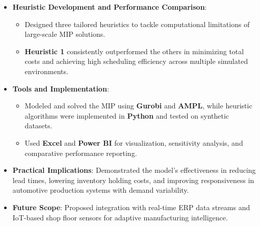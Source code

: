 \documentclass[letterpaper,10pt]{article}
\begin{document}
{\begin{itemize}
\begin{itemize}
    \end{itemize}
    \item \textbf{Heuristic Development and Performance Comparison}:
    \begin{itemize}
        \item Designed three tailored heuristics to tackle computational limitations of large-scale MIP solutions.
        \item \textbf{Heuristic 1} consistently outperformed the others in minimizing total costs and achieving high scheduling efficiency across multiple simulated environments.
    \end{itemize}
    \item \textbf{Tools and Implementation}:
    \begin{itemize}
        \item Modeled and solved the MIP using \textbf{Gurobi} and \textbf{AMPL}, while heuristic algorithms were implemented in \textbf{Python} and tested on synthetic datasets.
        \item Used \textbf{Excel} and \textbf{Power BI} for visualization, sensitivity analysis, and comparative performance reporting.
    \end{itemize}
    \item \textbf{Practical Implications}: Demonstrated the model’s effectiveness in reducing lead times, lowering inventory holding costs, and improving responsiveness in automotive production systems with demand variability.
    \item \textbf{Future Scope}: Proposed integration with real-time ERP data streams and IoT-based shop floor sensors for adaptive manufacturing intelligence.
\end{itemize}
}
\end{document}
